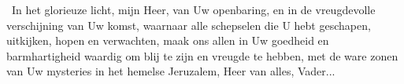 \documentclass[12pt,twoside,a5paper]{article}
\begin{document}
\begin{halfparskip}
  \cc~In het glorieuze licht, mijn Heer, van Uw openbaring, en in de vreugdevolle verschijning van Uw komst, waarnaar alle schepselen die U hebt geschapen, uitkijken, hopen en verwachten, maak ons allen in Uw goedheid en barmhartigheid waardig om blij te zijn en vreugde te hebben, met de ware zonen van Uw mysteries in het hemelse Jeruzalem, Heer van alles, Vader...
\end{halfparskip}




\end{document}
